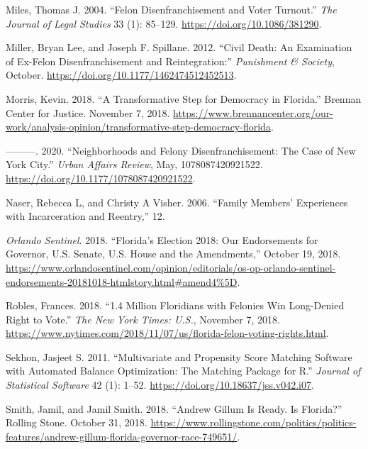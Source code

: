 \documentclass[
  12pt,
]{article}
\newlength{\cslhangindent}
\newenvironment{cslreferences}%
  {\setlength{\parindent}{0pt}%
  \everypar{\setlength{\hangindent}{\cslhangindent}}\ignorespaces}%
  {\par}
\begin{document}
\begin{cslreferences}
\leavevmode\hypertarget{ref-Miles2004}{}%
Miles, Thomas J. 2004. ``Felon Disenfranchisement and Voter Turnout.'' \emph{The Journal of Legal Studies} 33 (1): 85--129. \url{https://doi.org/10.1086/381290}.

\leavevmode\hypertarget{ref-Miller2012}{}%
Miller, Bryan Lee, and Joseph F. Spillane. 2012. ``Civil Death: An Examination of Ex-Felon Disenfranchisement and Reintegration:'' \emph{Punishment \& Society}, October. \url{https://doi.org/10.1177/1462474512452513}.

\leavevmode\hypertarget{ref-Morris2018}{}%
Morris, Kevin. 2018. ``A Transformative Step for Democracy in Florida.'' Brennan Center for Justice. November 7, 2018. \url{https://www.brennancenter.org/our-work/analysis-opinion/transformative-step-democracy-florida}.

\leavevmode\hypertarget{ref-Morris2020}{}%
---------. 2020. ``Neighborhoods and Felony Disenfranchisement: The Case of New York City.'' \emph{Urban Affairs Review}, May, 1078087420921522. \url{https://doi.org/10.1177/1078087420921522}.

\leavevmode\hypertarget{ref-Naser2006}{}%
Naser, Rebecca L, and Christy A Visher. 2006. ``Family Members' Experiences with Incarceration and Reentry,'' 12.

\leavevmode\hypertarget{ref-ORLANDOSENTINEL2018}{}%
\emph{Orlando Sentinel}. 2018. ``Florida's Election 2018: Our Endorsements for Governor, U.S. Senate, U.S. House and the Amendments,'' October 19, 2018. \url{https://www.orlandosentinel.com/opinion/editorials/os-op-orlando-sentinel-endorsements-20181018-htmlstory.html\#amend4\%5D}.

\leavevmode\hypertarget{ref-Robles2018}{}%
Robles, Frances. 2018. ``1.4 Million Floridians with Felonies Win Long-Denied Right to Vote.'' \emph{The New York Times: U.S.}, November 7, 2018. \url{https://www.nytimes.com/2018/11/07/us/florida-felon-voting-rights.html}.

\leavevmode\hypertarget{ref-Sekhon2011}{}%
Sekhon, Jasjeet S. 2011. ``Multivariate and Propensity Score Matching Software with Automated Balance Optimization: The Matching Package for R.'' \emph{Journal of Statistical Software} 42 (1): 1--52. \url{https://doi.org/10.18637/jss.v042.i07}.

\leavevmode\hypertarget{ref-Smith2018}{}%
Smith, Jamil, and Jamil Smith. 2018. ``Andrew Gillum Is Ready. Is Florida?'' Rolling Stone. October 31, 2018. \url{https://www.rollingstone.com/politics/politics-features/andrew-gillum-florida-governor-race-749651/}.


\end{cslreferences}
\end{document}
